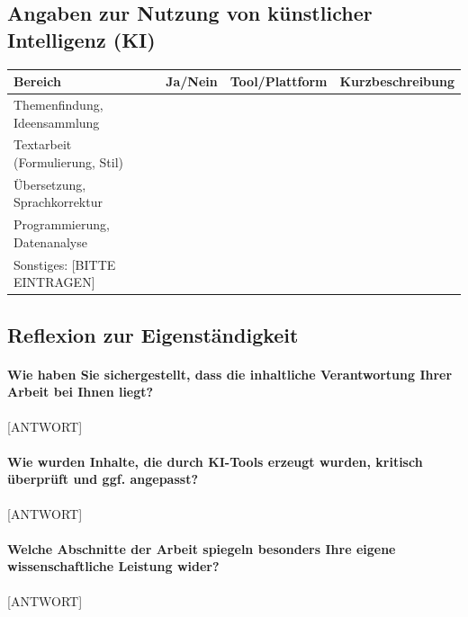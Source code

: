 \cleardoubleemptypage
\thispagestyle{empty}
\subsection*{Angaben zur Nutzung von künstlicher Intelligenz (KI)}

\begin{table}[h!]
    \centering
    \footnotesize    
\begin{tabular}{p{2.5cm}p{1.5cm}p{3cm}p{6.5cm}}
\toprule
Bereich & Ja/Nein & Tool/Plattform & Kurzbeschreibung \\
\midrule
Themenfindung, Ideensammlung & & & \\
\midrule
Textarbeit (Formulierung, Stil) & & & \\
\midrule
Übersetzung, Sprachkorrektur & & & \\
\midrule
Programmierung, Datenanalyse & & & \\
\midrule
Sonstiges: [BITTE EINTRAGEN]& & & \\
\bottomrule
\end{tabular}
\end{table}

\subsection*{Reflexion zur Eigenständigkeit}

\paragraph*{Wie haben Sie sichergestellt, dass die inhaltliche Verantwortung Ihrer Arbeit bei Ihnen liegt?}

[ANTWORT]

\paragraph*{Wie wurden Inhalte, die durch KI-Tools erzeugt wurden, kritisch überprüft und ggf. angepasst?}

[ANTWORT]

\paragraph*{Welche Abschnitte der Arbeit spiegeln besonders Ihre eigene wissenschaftliche Leistung wider?}

[ANTWORT]